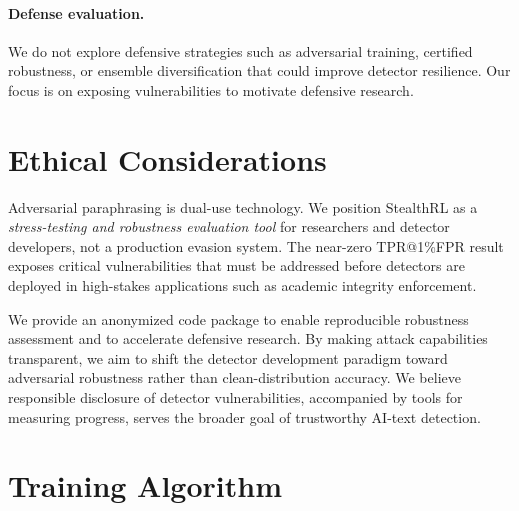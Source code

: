\documentclass[11pt]{article}
\begin{document}
\paragraph{Defense evaluation.} We do not explore defensive strategies such as adversarial training, certified robustness, or ensemble diversification that could improve detector resilience. Our focus is on exposing vulnerabilities to motivate defensive research.

\section{Ethical Considerations}

Adversarial paraphrasing is dual-use technology. We position StealthRL as a \emph{stress-testing and robustness evaluation tool} for researchers and detector developers, not a production evasion system. The near-zero TPR@1\%FPR result exposes critical vulnerabilities that must be addressed before detectors are deployed in high-stakes applications such as academic integrity enforcement.

We provide an anonymized code package to enable reproducible robustness assessment and to accelerate defensive research. By making attack capabilities transparent, we aim to shift the detector development paradigm toward adversarial robustness rather than clean-distribution accuracy. We believe responsible disclosure of detector vulnerabilities, accompanied by tools for measuring progress, serves the broader goal of trustworthy AI-text detection.


\clearpage

\appendix

\section{Training Algorithm}
\label{app:algorithm}
\end{document}
